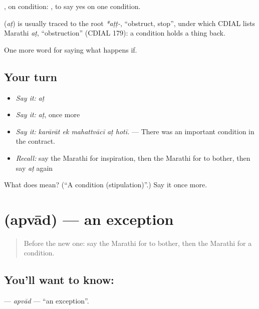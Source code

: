 , on condition:    , to say yes on one condition.

\begin{cousinweb}
\textbf{} (\emph{aṭ}) is usually traced to the root \emph{*aṭṭ-}, \textquotedblleft{}obstruct, stop\textquotedblright{}, under which CDIAL lists Marathi \emph{aṭ}, \textquotedblleft{}obstruction\textquotedblright{} (CDIAL 179): a condition holds a thing back.
\end{cousinweb}

\begin{grammarlens}[title={What you've built}]
One more word for saying what happens if.
\end{grammarlens}

\subsection*{Your turn}
\begin{itemize}
\raggedright
  \item \emph{Say it:} \emph{aṭ}
  \item \emph{Say it:} \emph{aṭ}, once more
  \item \emph{Say it:} \emph{karārāt ek mahattvācī aṭ hotī.} — There was an important condition in the contract.
  \item \emph{Recall:} say the Marathi for inspiration, then the Marathi for to bother, then say \emph{aṭ} again
\end{itemize}

\begin{tcolorbox}[breakable,colback=teal!4,colframe=teal!35!black,title={Before you move on}]
What does  mean? (\textquotedblleft{}A condition (stipulation)\textquotedblright{}.) Say it once more.
\end{tcolorbox}
\section[\texorpdfstring{\mr{अपवाद} (apvād)}{अपवाद (apvād)}]{ (apvād) — an exception}

\label{lesson:MR-C378-apvad}



\begin{quote}
Before the new one: say the Marathi for to bother, then the Marathi for a condition.
\end{quote}

\subsection*{You'll want to know: }
\textbf{} — \emph{apvād} — \textquotedblleft{}an exception\textquotedblright{}.

